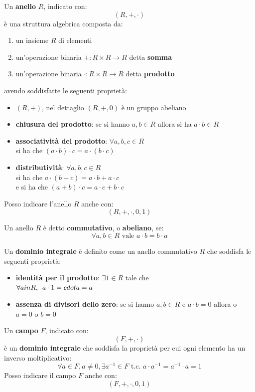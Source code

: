 \documentclass[a4paper,12pt, oneside]{book}
\begin{document}
\begin{definizione}
  Un \textbf{anello} $R$, indicato con:
  \[(R, +,\cdot)\]
  è una struttura algebrica composta da:
  \begin{enumerate}
    \item un insieme $R$ di elementi
    \item un'operazione binaria $+:R\times R\to R$ detta \textbf{somma}
    \item un'operazione binaria $\cdot:R\times R\to R$ detta \textbf{prodotto}
  \end{enumerate}
  avendo soddisfatte le seguenti proprietà:
  \begin{itemize}
    \item $(R,+)$, nel dettaglio $(R,+,0)$ è un gruppo abeliano
    \item \textbf{chiusura del prodotto}: se si hanno $a,b\in R$ allora si ha
    $a\cdot b\in R$
    \item \textbf{associatività del prodotto}: $\forall a,b,c\in R$\\
    si ha che $(a\cdot b)\cdot c= a\cdot (b\cdot c)$ 
    \item \textbf{distributività}: $\forall a,b,c\in R$\\
    si ha che $a \cdot(b + c)= a \cdot b + a \cdot c$\\
    e si ha che $(a + b)\cdot c = a \cdot c + b \cdot c$
  \end{itemize}
  Posso indicare l'anello $R$ anche con:
  \[(R, +,\cdot,0,1)\]
\end{definizione}
\begin{definizione}
  Un anello $R$ è detto \textbf{commutativo}, o \textbf{abeliano}, se:
  \[\forall a,b\in R\mbox{ vale }a\cdot b=b\cdot a\]
\end{definizione}
\begin{definizione}
  Un \textbf{dominio integrale} è definito come un anello commutativo $R$ che
  soddisfa le seguenti proprietà:
  \begin{itemize}
    \item \textbf{identità per il prodotto}: $\exists 1\in R$ tale che\\
    $\forall a in R,\,\,\,a\cdot 1=\\cdot a=a$
    \item \textbf{assenza di divisori dello zero}: se si hanno $a,b\in R$ e
    $a\cdot b=0$ allora o $a=0$ o $b=0$
  \end{itemize}
\end{definizione}
\begin{definizione}
  Un \textbf{campo} $F$, indicato con:
  \[(F, +,\cdot)\]
  è un \textbf{dominio integrale} che soddisfa la proprietà per cui ogni
  elemento ha un inverso moltiplicativo:
  \[\forall a\in F, a\neq 0, \exists a^{-1}\in F\mbox{ t.c. } a\cdot
    a^{-1}=a^{-1}\cdot a = 1\]
  Posso indicare il campo $F$ anche con:
  \[(F, +,\cdot,0,1)\]
\end{definizione}
\end{document}
